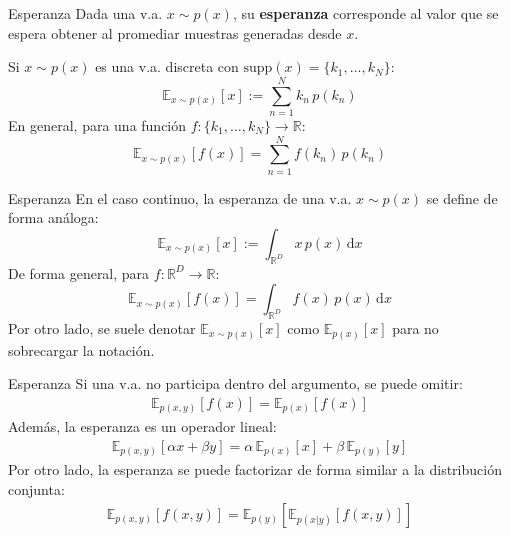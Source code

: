 \documentclass{beamer}
\newcommand{\R}{\mathbb{R}}
\begin{document}
\begin{frame}{Esperanza}
    Dada una v.a. $x\sim p(x)$, su \textbf{esperanza} corresponde al valor que se espera obtener al promediar muestras generadas desde $x$.

    Si $x\sim p(x)$ es una v.a. discreta con $\text{supp}(x)=\{k_1,\ldots,k_N\}$:
    \begin{equation*}
        \mathbb{E}_{x\sim p(x)}\left[x\right]:=\sum_{n=1}^N k_n\,p(k_n)
    \end{equation*}
    En general, para una función $f:\{k_1,\ldots,k_N\}\to\R$:
    \begin{equation*}
        \mathbb{E}_{x\sim p(x)}\left[f(x)\right]=\sum_{n=1}^N f(k_n)\, p(k_n)
    \end{equation*}
\end{frame}

\begin{frame}{Esperanza}
    En el caso continuo, la esperanza de una v.a. $x\sim p(x)$ se define de forma análoga:
    \begin{equation*}
        \mathbb{E}_{x\sim p(x)}\left[x\right]
        :=\int_{\R^D} x\, p(x)\,\text{d}x
    \end{equation*}
    De forma general, para $f:\R^D\to\R$:
    \begin{equation*}
        \mathbb{E}_{x\sim p(x)}\left[f(x)\right]
        =\int_{\R^D} f(x)\, p(x)\,\text{d}x
    \end{equation*}
    Por otro lado, se suele denotar $\mathbb{E}_{x\sim p(x)}\left[x\right]$ como $\mathbb{E}_{p(x)}\left[x\right]$ para no sobrecargar la notación.
\end{frame}

\begin{frame}{Esperanza}
    Si una v.a. no participa dentro del argumento, se puede omitir:
    \begin{align*}
        \mathbb{E}_{p(x,y)}[f(x)]=\mathbb{E}_{p(x)}[f(x)]
    \end{align*}
    Además, la esperanza es un operador lineal:
    \begin{align*}
        \mathbb{E}_{p(x,y)}[\alpha x+\beta y]
        =\alpha\,\mathbb{E}_{p(x)}[x] + \beta\,\mathbb{E}_{p(y)}[y]
    \end{align*}
    Por otro lado, la esperanza se puede factorizar de forma similar a la distribución conjunta:
    \begin{align*}
        \mathbb{E}_{p(x,y)}[f(x,y)] =
        \mathbb{E}_{p(y)}\left[\mathbb{E}_{p(x|y)}[f(x,y)]\right]
    \end{align*}
\end{frame}
\end{document}
